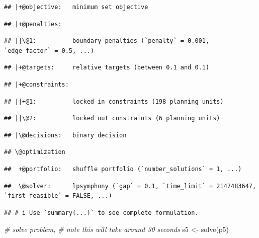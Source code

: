 \documentclass[
  12pt,
]{book}
\newenvironment{Shaded}{\begin{snugshade}}{\end{snugshade}}
\newcommand{\CommentTok}[1]{\textcolor[rgb]{0.56,0.35,0.01}{\textit{#1}}}
\newcommand{\FunctionTok}[1]{\textcolor[rgb]{0.00,0.00,0.00}{#1}}
\newcommand{\NormalTok}[1]{#1}
\newcommand{\OtherTok}[1]{\textcolor[rgb]{0.56,0.35,0.01}{#1}}
\begin{document}
\begin{verbatim}
## |+@objective:   minimum set objective
\end{verbatim}

\begin{verbatim}
## |+@penalties:
\end{verbatim}

\begin{verbatim}
## ||\@1:          boundary penalties (`penalty` = 0.001, `edge_factor` = 0.5, ...)
\end{verbatim}

\begin{verbatim}
## |+@targets:     relative targets (between 0.1 and 0.1)
\end{verbatim}

\begin{verbatim}
## |+@constraints:
\end{verbatim}

\begin{verbatim}
## ||+@1:          locked in constraints (198 planning units)
\end{verbatim}

\begin{verbatim}
## ||\@2:          locked out constraints (6 planning units)
\end{verbatim}

\begin{verbatim}
## |\@decisions:   binary decision
\end{verbatim}

\begin{verbatim}
## \@optimization
\end{verbatim}

\begin{verbatim}
##  +@portfolio:   shuffle portfolio (`number_solutions` = 1, ...)
\end{verbatim}

\begin{verbatim}
##  \@solver:      lpsymphony (`gap` = 0.1, `time_limit` = 2147483647, `first_feasible` = FALSE, ...)
\end{verbatim}

\begin{verbatim}
## # i Use `summary(...)` to see complete formulation.
\end{verbatim}

\begin{Shaded}
\begin{Highlighting}[]
\CommentTok{\# solve problem,}
\CommentTok{\# note this will take around 30 seconds}
\NormalTok{s5 }\OtherTok{\textless{}{-}} \FunctionTok{solve}\NormalTok{(p5)}
\end{Highlighting}
\end{Shaded}
\end{document}
